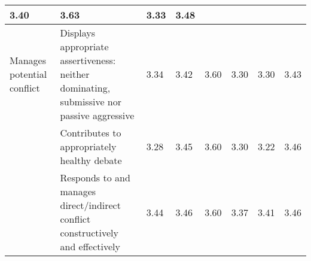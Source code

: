 \documentclass[sigconf, anonymous=true]{acmart}
\begin{document}
\begin{table*}[ht]
\begin{tabular} {| p{2cm} | p{7cm} | p{1cm}| p{1cm} | p{1cm}| p{1cm} |p{1cm} |p{1cm} |}
		 3.40                                                     & 3.63                                                 & 3.33                                                 & 3.48                                               \\
		\hline
		Manages potential conflict          & Displays appropriate assertiveness: neither dominating, submissive nor passive aggressive        &
		3.34 &
		3.42 &
		 3.60                                                     & 3.30                                                 & 3.30                                                 & 3.43                                               \\
		\hline
		& Contributes to appropriately healthy debate                                                      &
		3.28 &
		3.45 &
		 3.60                                                     & 3.30                                                 & 3.22                                                 & 3.46                                               \\
		
		\hline
		& Responds to and manages direct/indirect conflict constructively and effectively                  &
		3.44 &
		3.46 &
		 3.60                                                     & 3.37                                                 & 3.41                                                 & 3.46                                               \\
		\hline
		
		
	\end{tabular}
	\label{tab:means}
\end{table*}
\end{document}
